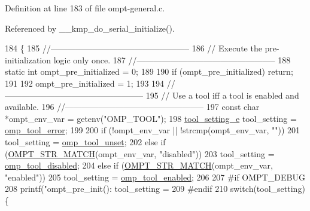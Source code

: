 Definition at line 183 of file ompt-\/general.\-c.



Referenced by \-\_\-\-\_\-kmp\-\_\-do\-\_\-serial\-\_\-initialize().


\begin{DoxyCode}
184 \{
185     \textcolor{comment}{//--------------------------------------------------}
186     \textcolor{comment}{// Execute the pre-initialization logic only once.}
187     \textcolor{comment}{//--------------------------------------------------}
188     \textcolor{keyword}{static} \textcolor{keywordtype}{int} ompt\_pre\_initialized = 0;
189 
190     \textcolor{keywordflow}{if} (ompt\_pre\_initialized) \textcolor{keywordflow}{return};
191 
192     ompt\_pre\_initialized = 1;
193 
194     \textcolor{comment}{//--------------------------------------------------}
195     \textcolor{comment}{// Use a tool iff a tool is enabled and available.}
196     \textcolor{comment}{//--------------------------------------------------}
197     \textcolor{keyword}{const} \textcolor{keywordtype}{char} *ompt\_env\_var = getenv(\textcolor{stringliteral}{"OMP\_TOOL"});
198     \hyperlink{ompt-general_8c_ab0b313a63028003b4a1588cc33930150}{tool\_setting\_e} tool\_setting = \hyperlink{ompt-general_8c_ab0b313a63028003b4a1588cc33930150a1779489eca2c49f635fcfab7266ef80f}{omp\_tool\_error};
199 
200     \textcolor{keywordflow}{if} (!ompt\_env\_var  || !strcmp(ompt\_env\_var, \textcolor{stringliteral}{""}))
201         tool\_setting = \hyperlink{ompt-general_8c_ab0b313a63028003b4a1588cc33930150abe3b1ebe5606a3de4251e2db7740c2de}{omp\_tool\_unset};
202     \textcolor{keywordflow}{else} \textcolor{keywordflow}{if} (\hyperlink{ompt-specific_8h_a38712776a3564cf1f0deca5df0733a97}{OMPT\_STR\_MATCH}(ompt\_env\_var, \textcolor{stringliteral}{"disabled"}))
203         tool\_setting = \hyperlink{ompt-general_8c_ab0b313a63028003b4a1588cc33930150acde951fd07e4a6b885afb8598632ea73}{omp\_tool\_disabled};
204     \textcolor{keywordflow}{else} \textcolor{keywordflow}{if} (\hyperlink{ompt-specific_8h_a38712776a3564cf1f0deca5df0733a97}{OMPT\_STR\_MATCH}(ompt\_env\_var, \textcolor{stringliteral}{"enabled"}))
205         tool\_setting = \hyperlink{ompt-general_8c_ab0b313a63028003b4a1588cc33930150a5fb54a43c51391a74611e52e8dd7d5b9}{omp\_tool\_enabled};
206 
207 \textcolor{preprocessor}{#if OMPT\_DEBUG}
208 \textcolor{preprocessor}{}    printf(\textcolor{stringliteral}{"ompt\_pre\_init(): tool\_setting = %
209 \textcolor{preprocessor}{#endif}
210 \textcolor{preprocessor}{}    \textcolor{keywordflow}{switch}(tool\_setting) \{
}
\end{DoxyCode}
